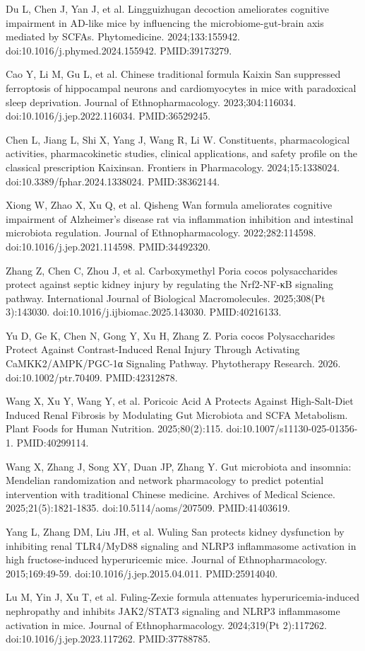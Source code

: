 \documentclass[11pt,oneside]{book}
\newcommand{\refend}{\endgroup\par}
\newcommand{\reff}[2]{\par\hangindent=7mm\hangafter=1\noindent[#1]\hspace{2mm}#2\par}
\begin{document}
\reff{38}{Du L, Chen J, Yan J, et al. Lingguizhugan decoction ameliorates cognitive impairment in AD-like mice by influencing the microbiome-gut-brain axis mediated by SCFAs. Phytomedicine. 2024;133:155942. doi:10.1016/j.phymed.2024.155942. PMID:39173279.}
\reff{39}{Cao Y, Li M, Gu L, et al. Chinese traditional formula Kaixin San suppressed ferroptosis of hippocampal neurons and cardiomyocytes in mice with paradoxical sleep deprivation. Journal of Ethnopharmacology. 2023;304:116034. doi:10.1016/j.jep.2022.116034. PMID:36529245.}
\reff{40}{Chen L, Jiang L, Shi X, Yang J, Wang R, Li W. Constituents, pharmacological activities, pharmacokinetic studies, clinical applications, and safety profile on the classical prescription Kaixinsan. Frontiers in Pharmacology. 2024;15:1338024. doi:10.3389/fphar.2024.1338024. PMID:38362144.}
\reff{41}{Xiong W, Zhao X, Xu Q, et al. Qisheng Wan formula ameliorates cognitive impairment of Alzheimer's disease rat via inflammation inhibition and intestinal microbiota regulation. Journal of Ethnopharmacology. 2022;282:114598. doi:10.1016/j.jep.2021.114598. PMID:34492320.}
\reff{42}{Zhang Z, Chen C, Zhou J, et al. Carboxymethyl Poria cocos polysaccharides protect against septic kidney injury by regulating the Nrf2-NF-κB signaling pathway. International Journal of Biological Macromolecules. 2025;308(Pt 3):143030. doi:10.1016/j.ijbiomac.2025.143030. PMID:40216133.}
\reff{43}{Yu D, Ge K, Chen N, Gong Y, Xu H, Zhang Z. Poria cocos Polysaccharides Protect Against Contrast-Induced Renal Injury Through Activating CaMKK2/AMPK/PGC-1α Signaling Pathway. Phytotherapy Research. 2026. doi:10.1002/ptr.70409. PMID:42312878.}
\reff{44}{Wang X, Xu Y, Wang Y, et al. Poricoic Acid A Protects Against High-Salt-Diet Induced Renal Fibrosis by Modulating Gut Microbiota and SCFA Metabolism. Plant Foods for Human Nutrition. 2025;80(2):115. doi:10.1007/s11130-025-01356-1. PMID:40299114.}
\reff{45}{Wang X, Zhang J, Song XY, Duan JP, Zhang Y. Gut microbiota and insomnia: Mendelian randomization and network pharmacology to predict potential intervention with traditional Chinese medicine. Archives of Medical Science. 2025;21(5):1821-1835. doi:10.5114/aoms/207509. PMID:41403619.}
\reff{46}{Yang L, Zhang DM, Liu JH, et al. Wuling San protects kidney dysfunction by inhibiting renal TLR4/MyD88 signaling and NLRP3 inflammasome activation in high fructose-induced hyperuricemic mice. Journal of Ethnopharmacology. 2015;169:49-59. doi:10.1016/j.jep.2015.04.011. PMID:25914040.}
\reff{47}{Lu M, Yin J, Xu T, et al. Fuling-Zexie formula attenuates hyperuricemia-induced nephropathy and inhibits JAK2/STAT3 signaling and NLRP3 inflammasome activation in mice. Journal of Ethnopharmacology. 2024;319(Pt 2):117262. doi:10.1016/j.jep.2023.117262. PMID:37788785.}
\refend
\end{document}
